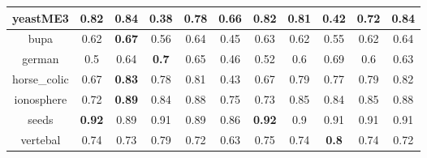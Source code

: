 \documentclass{article}%
\begin{document}
\begin{tabular}{c|cccccccccc}
\hline%
yeastME3&0.82&\textbf{0.84}&0.38&0.78&0.66&0.82&0.81&0.42&0.72&\textbf{0.84}\\%
\hline%
bupa&0.62&\textbf{0.67}&0.56&0.64&0.45&0.63&0.62&0.55&0.62&0.64\\%
\hline%
german&0.5&0.64&\textbf{0.7}&0.65&0.46&0.52&0.6&0.69&0.6&0.63\\%
\hline%
horse\_colic&0.67&\textbf{0.83}&0.78&0.81&0.43&0.67&0.79&0.77&0.79&0.82\\%
\hline%
ionosphere&0.72&\textbf{0.89}&0.84&0.88&0.75&0.73&0.85&0.84&0.85&0.88\\%
\hline%
seeds&\textbf{0.92}&0.89&0.91&0.89&0.86&\textbf{0.92}&0.9&0.91&0.91&0.91\\%
\hline%
vertebal&0.74&0.73&0.79&0.72&0.63&0.75&0.74&\textbf{0.8}&0.74&0.72\\%
\hline%
\end{tabular}

%
\end{document}
